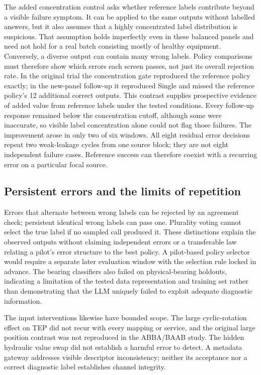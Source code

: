 \documentclass[11pt,a4paper]{article}
\begin{document}
The added concentration control asks whether reference labels contribute beyond a visible failure symptom. It can be applied to the same outputs without labelled answers, but it also assumes that a highly concentrated label distribution is suspicious. That assumption holds imperfectly even in these balanced panels and need not hold for a real batch consisting mostly of healthy equipment. Conversely, a diverse output can contain many wrong labels. Policy comparisons must therefore show which errors each screen passes, not just its overall rejection rate. In the original trial the concentration gate reproduced the reference policy exactly; in the new-panel follow-up it reproduced Single and missed the reference policy's 12 additional correct outputs. This contrast supplies prospective evidence of added value from reference labels under the tested conditions. Every follow-up response remained below the concentration cutoff, although some were inaccurate, so visible label concentration alone could not flag those failures. The improvement arose in only two of six windows. All eight residual error decisions repeat two weak-leakage cycles from one source block; they are not eight independent failure cases. Reference success can therefore coexist with a recurring error on a particular focal source.

\subsection{Persistent errors and the limits of repetition}
Errors that alternate between wrong labels can be rejected by an agreement check; persistent identical wrong labels can pass one. Plurality voting cannot select the true label if no sampled call produced it. These distinctions explain the observed outputs without claiming independent errors or a transferable law relating a pilot's error structure to the best policy. A pilot-based policy selector would require a separate later evaluation window with the selection rule locked in advance. The bearing classifiers also failed on physical-bearing holdouts, indicating a limitation of the tested data representation and training set rather than demonstrating that the LLM uniquely failed to exploit adequate diagnostic information.

The input interventions likewise have bounded scope. The large cyclic-rotation effect on TEP did not recur with every mapping or service, and the original large position contrast was not reproduced in the ABBA/BAAB study. The hidden hydraulic value swap did not establish a harmful error to detect. A metadata gateway addresses visible descriptor inconsistency; neither its acceptance nor a correct diagnostic label establishes channel integrity.
\end{document}
